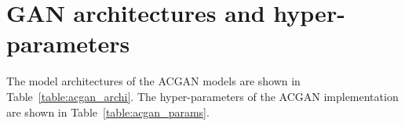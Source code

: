 \documentclass[twocolumn]{article}
\numberwithin{equation}{section}
\begin{document}

\section{GAN architectures and hyper-parameters}\label{appendix:acgan_setup}

The model architectures of the ACGAN models are shown in Table~\ref{table:acgan_archi}. 
The hyper-parameters of the ACGAN implementation are shown in Table~\ref{table:acgan_params}. 
\end{document}
